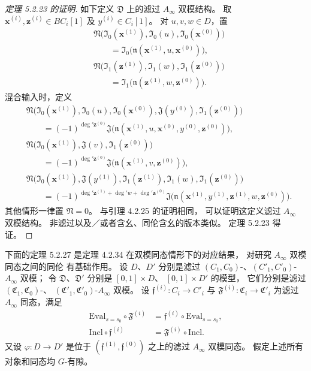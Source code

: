 \begin{proof}[定理 5.2.23 的证明]
如下定义 $\mathfrak D$ 上的滤过
$A_\infty$ 双模结构。
取 $\mathbf x^{(i)},\mathbf z^{(i)}
\in B C_i[1]$ 及 $y^{(i)}\in C_i[1]$。
对 $u,v,w\in D$，置
\[
\begin{aligned}
&\mathfrak N\bigl(
\mathfrak I_0(\mathbf x^{(1)}),
\mathfrak I_0(u),
\mathfrak I_0(\mathbf x^{(0)})\bigr)\\
&\qquad=\mathfrak I_0\bigl(
\mathfrak n(\mathbf x^{(1)},u,\mathbf x^{(0)})\bigr),\\
&\mathfrak N\bigl(
\mathfrak I_1(\mathbf z^{(1)}),
\mathfrak I_1(w),
\mathfrak I_1(\mathbf z^{(0)})\bigr)\\
&\qquad=\mathfrak I_1\bigl(
\mathfrak n(\mathbf z^{(1)},w,\mathbf z^{(0)})\bigr).
\end{aligned}
\]
混合输入时，定义
\[
\begin{aligned}
&\mathfrak N\bigl(
\mathfrak I_0(\mathbf x^{(1)}),
\mathfrak I_0(u),
\mathfrak I_0(\mathbf x^{(0)}),
\mathfrak J(y^{(0)}),
\mathfrak I_1(\mathbf z^{(0)})\bigr)\\
&\qquad=(-1)^{\deg'\mathbf z^{(0)}}
\mathfrak J\bigl(
\mathfrak n(\mathbf x^{(1)},u,
\mathbf x^{(0)},y^{(0)},\mathbf z^{(0)})\bigr),\\[0.5ex]
&\mathfrak N\bigl(
\mathfrak I_0(\mathbf x^{(1)}),
\mathfrak J(v),
\mathfrak I_1(\mathbf z^{(0)})\bigr)\\
&\qquad=(-1)^{\deg'\mathbf z^{(0)}}
\mathfrak J\bigl(
\mathfrak n(\mathbf x^{(1)},v,\mathbf z^{(0)})\bigr),\\[0.5ex]
&\mathfrak N\bigl(
\mathfrak I_0(\mathbf x^{(1)}),
\mathfrak J(y^{(1)}),
\mathfrak I_1(\mathbf z^{(1)}),
\mathfrak I_1(w),
\mathfrak I_1(\mathbf z^{(0)})\bigr)\\
&\qquad=(-1)^{
\deg'\mathbf z^{(1)}+\deg' w+\deg'\mathbf z^{(0)}}
\mathfrak J\bigl(
\mathfrak n(\mathbf x^{(1)},y^{(1)},
\mathbf z^{(1)},w,\mathbf z^{(0)})\bigr).
\end{aligned}
\]
其他情形一律置 $\mathfrak N=0$。
与引理 4.2.25 的证明相同，
可以证明这定义滤过 $A_\infty$ 双模结构。
非滤过以及／或者含幺、同伦含幺的版本类似。
定理 5.2.23 得证。
\end{proof}

下面的定理 5.2.27 是定理 4.2.34
在双模同态情形下的对应结果，
对研究 $A_\infty$ 双模同态之间的同伦
有基础作用。
设 $D$、$D'$ 分别是滤过
$(C_1,C_0)$-、$(C'_1,C'_0)$-$A_\infty$ 双模；
令 $\mathfrak D$、$\mathfrak D'$
分别是 $[0,1]\times D$、
$[0,1]\times D'$ 的模型，
它们分别是滤过
$(\mathfrak C_1,\mathfrak C_0)$-、
$(\mathfrak C'_1,\mathfrak C'_0)$-$A_\infty$ 双模。
设 $\mathfrak f^{(i)}:C_i\to C'_i$
与 $\mathfrak F^{(i)}:\mathfrak C_i\to\mathfrak C'_i$
为滤过 $A_\infty$ 同态，满足
\[
\begin{aligned}
\mathrm{Eval}_{s=s_0}\circ\mathfrak F^{(i)}
&=\mathfrak f^{(i)}\circ\mathrm{Eval}_{s=s_0},\\
\mathrm{Incl}\circ\mathfrak f^{(i)}
&=\mathfrak F^{(i)}\circ\mathrm{Incl}.
\end{aligned}
\]
又设 $\varphi:D\to D'$ 是位于
$(\mathfrak f^{(1)},\mathfrak f^{(0)})$
之上的滤过 $A_\infty$ 双模同态。
假定上述所有对象和同态均 $G$-有隙。

